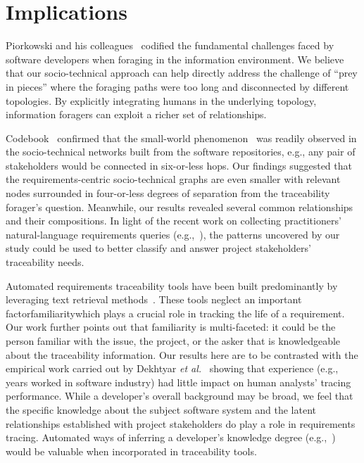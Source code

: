 \documentclass[conference]{IEEEtran}
\begin{document}


\section{Implications}

Piorkowski and his colleagues~\cite{navValueCost} codified the fundamental challenges faced by software developers when foraging in the information environment. We believe that our socio-technical approach can help directly address the challenge of ``prey in pieces'' where the foraging paths were too long and disconnected by different topologies. By explicitly integrating humans in the underlying topology, information foragers can exploit a richer set of relationships.

Codebook~\cite{codebook10} confirmed that the small-world phenomenon~\cite{Chakrabarti-CSUR06} was readily observed in the socio-technical networks built from the software repositories, e.g., any pair of stakeholders would be connected in six-or-less hops. Our findings suggested that the requirements-centric socio-technical graphs are even smaller with relevant nodes surrounded in four-or-less degrees of separation from the traceability forager's question. Meanwhile, our results revealed several common relationships and their compositions. In light of the recent work on collecting practitioners' natural-language requirements queries (e.g.,~\cite{Pruski-REJ15, Lohar-REFSQ16, Malviya-RE17}), the patterns uncovered by our study could be used to better classify and answer project stakeholders' traceability needs.

Automated requirements traceability tools have been built predominantly by leveraging text retrieval methods~\cite{ICSE15}. These tools neglect an important factor\textemdash familiarity\textemdash which plays a crucial role in tracking the life of a requirement. Our work further points out that familiarity is multi-faceted: it could be the person familiar with the issue, the project, or the asker that is knowledgeable about the traceability information. Our results here are to be contrasted with the empirical work carried out by Dekhtyar \emph{et al.}~\cite{Dekhtyar-RE11} showing that experience (e.g., years worked in software industry) had little impact on human analysts' tracing performance. While a developer's overall background may be broad, we feel that the specific knowledge about the subject software system and the latent relationships established with project stakeholders do play a role in requirements tracing. Automated ways of inferring a developer's knowledge degree (e.g.,~\cite{Fritz-TOSEM14}) would be valuable when incorporated in traceability tools.
\end{document}
